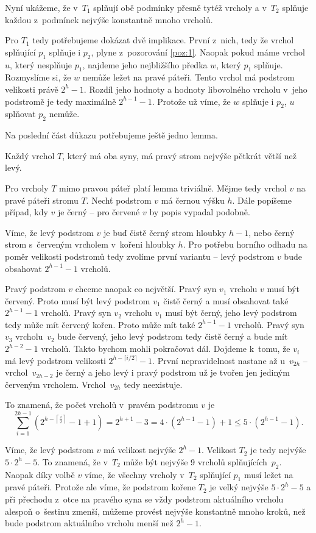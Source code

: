 \begin{dukaz}
Nyní ukážeme, že v~$T_1$ splňují obě podmínky přesně tytéž vrcholy a v~$T_2$ splňuje každou z~podmínek nejvýše konstantně mnoho vrcholů.

Pro $T_1$ tedy potřebujeme dokázat dvě implikace. První z~nich, tedy že vrchol
splňující $p_1$ splňuje i $p_2$, plyne z~pozorování \ref{poz:1}. Naopak pokud
máme vrchol $u$, který nesplňuje $p_1$, najdeme jeho nejbližšího předka $w$,
který $p_1$ splňuje. Rozmyslíme si, že $w$ nemůže ležet na pravé páteři. Tento vrchol má podstrom velikosti právě $2^{h}-1$. Rozdíl
jeho hodnoty a hodnoty libovolného vrcholu v~jeho podstromě je tedy maximálně
$2^{h-1}-1$. Protože už víme, že $w$ splňuje i $p_2$, $u$ splňovat $p_2$
nemůže.

Na poslední část důkazu potřebujeme ještě jedno lemma.

\begin{lemma}
Každý vrchol $T$, který má oba syny, má pravý strom nejvýše pětkrát větší než levý.
\end{lemma}
\begin{dukaz}
Pro vrcholy $T$ mimo pravou páteř platí lemma triviálně. Mějme tedy vrchol $v$ na pravé páteři stromu $T$. Nechť podstrom $v$ má černou výšku $h$. Dále popíšeme případ, kdy $v$ je černý -- pro červené $v$ by popis vypadal podobně. 

Víme, že levý podstrom $v$ je buď čistě černý strom hloubky $h-1$, nebo černý strom s~červeným vrcholem v~kořeni hloubky $h$. Pro potřebu horního odhadu na poměr velikosti podstromů tedy zvolíme první variantu -- levý podstrom $v$ bude obsahovat $2^{h-1} -1$ vrcholů. 

Pravý podstrom $v$ chceme naopak co největší. Pravý syn $v_1$ vrcholu $v$ 
musí být červený. Proto musí být levý podstrom $v_1$ čistě černý a musí
obsahovat také $2^{h-1} -1$ vrcholů. Pravý syn $v_2$ vrcholu $v_1$ musí být
černý, jeho levý podstrom tedy může mít červený kořen. Proto může mít také
$2^{h-1} -1$ vrcholů. Pravý syn~$v_3$ vrcholu~$v_2$ bude červený, jeho levý
podstrom tedy čistě černý a bude mít $2^{h-2}-1$ vrcholů. Takto bychom
mohli pokračovat dál. Dojdeme k~tomu, že $v_i$ má levý podstrom velikosti
$2^{h-\lceil i/2\rceil} -1$. První nepravidelnost nastane až u~$v_{2h}$ --
vrchol~$v_{2h-2}$ je černý a jeho levý i pravý podstrom už je tvořen jen
jediným červeným vrcholem. Vrchol~$v_{2h}$ tedy neexistuje.

To znamená, že počet vrcholů v~pravém podstromu $v$ je $$\sum_{i=1}^{2h-1}\left(2^{h-\left\lceil \frac i2\right\rceil} -1 +1\right) = 2^{h+1}-3 = 4\cdot (2^{h-1}-1) +1 \leq 5\cdot(2^{h-1}-1).$$
\end{dukaz}

Víme, že levý podstrom $v$ má velikost nejvýše $2^h-1$. Velikost $T_2$ je tedy nejvýše $5\cdot 2^h - 5$. To znamená, že v~$T_2$ může být nejvýše 9 vrcholů splňujících~$p_2$. Naopak díky volbě $v$ víme, že všechny vrcholy v~$T_2$ splňující $p_1$ musí ležet na pravé páteři. Protože ale víme, že podstrom kořene $T_2$ je velký nejvýše $5\cdot 2^h-5$ a při přechodu z~otce na pravého syna se vždy podstrom aktuálního vrcholu alespoň o~šestinu zmenší, můžeme provést nejvýše konstantně mnoho kroků, než bude podstrom aktuálního vrcholu menší než $2^h-1$. 
\end{dukaz}

